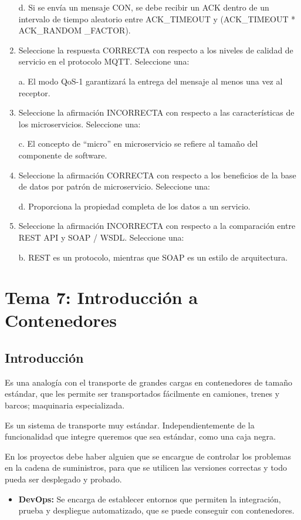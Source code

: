 \documentclass[12pt, twoside, openright]{report} %
\begin{document}
\begin{enumerate}
	      d. Si se envía un mensaje CON, se debe recibir un ACK dentro de un intervalo de tiempo aleatorio entre ACK\_TIMEOUT y (ACK\_TIMEOUT * ACK\_RANDOM \_FACTOR).

	\item Seleccione la respuesta CORRECTA con respecto a los niveles de calidad de servicio en el protocolo MQTT.	Seleccione una:

	      a. El modo QoS-1 garantizará la entrega del mensaje al menos una vez al receptor.

	\item Seleccione la afirmación INCORRECTA con respecto a las características de los microservicios. Seleccione una:

	      c. El concepto de \enquote{micro} en microservicio se refiere al tamaño del componente de software.

	\item Seleccione la afirmación CORRECTA con respecto a los beneficios de la base de datos por patrón de microservicio. Seleccione una:

	      d. Proporciona la propiedad completa de los datos a un servicio.
	\item Seleccione la afirmación INCORRECTA con respecto a la comparación entre REST API y SOAP / WSDL. 	Seleccione una:

	      b. REST es un protocolo, mientras que SOAP es un estilo de arquitectura.
\end{enumerate}

\chapter{Tema 7: Introducción a Contenedores}
\section{Introducción}
Es una analogía con el transporte de grandes cargas en contenedores de tamaño estándar, que les permite ser transportados fácilmente en camiones, trenes y barcos; maquinaria especializada.

Es un sistema de transporte muy estándar. Independientemente de la funcionalidad que integre queremos que sea estándar, como una caja negra.

En los proyectos debe haber alguien que se encargue de controlar los problemas en la cadena de suministros, para que se utilicen las versiones correctas y todo pueda ser desplegado y probado.
\begin{itemize}
	\item \textbf{DevOps:} Se encarga de establecer entornos que permiten la integración, prueba y despliegue automatizado, que se puede conseguir con contenedores.
\end{itemize}
\end{document}
